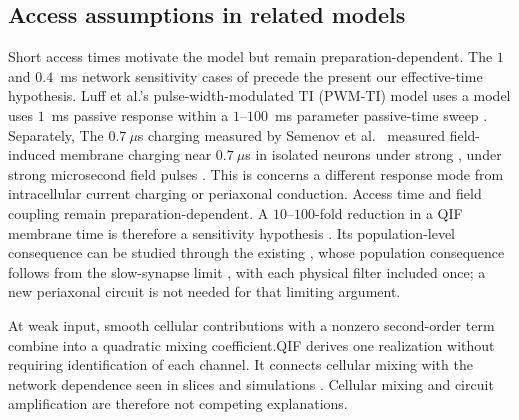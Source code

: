 \documentclass[11pt,a4paper]{article}
\providecommand{\DIFaddtex}[1]{{\protect\color{blue} \sf #1}} %
\providecommand{\DIFdeltex}[1]{{\protect\color{red} \scriptsize #1}} %
\providecommand{\DIFaddbegin}{} %
\providecommand{\DIFaddend}{} %
\providecommand{\DIFdelbegin}{} %
\providecommand{\DIFdelend}{} %
\providecommand{\DIFadd}[1]{\texorpdfstring{\DIFaddtex{#1}}{#1}} %
\providecommand{\DIFdel}[1]{\texorpdfstring{\DIFdeltex{#1}}{}} %
\begin{document}
\subsection{\DIFadd{Access assumptions in related models}}
\DIFadd{Short access times motivate the model but remain preparation-dependent}\DIFaddend .
The $1$ and $0.4$~ms \DIFdelbegin \DIFdel{network sensitivity }\DIFdelend cases of \cite{esmaeilpour2021} precede \DIFdelbegin \DIFdel{the present }\DIFdelend \DIFaddbegin \DIFadd{our }\DIFaddend effective-time
hypothesis. Luff et al.'s pulse-width-modulated TI \DIFdelbegin \DIFdel{(PWM-TI) model uses a }\DIFdelend \DIFaddbegin \DIFadd{model uses }\DIFaddend $1$~ms \DIFdelbegin \DIFdel{passive response }\DIFdelend within a
$1$--$100$~ms \DIFdelbegin \DIFdel{parameter }\DIFdelend \DIFaddbegin \DIFadd{passive-time }\DIFaddend sweep \cite{luff2024}. \DIFdelbegin \DIFdel{Separately, }\DIFdelend \DIFaddbegin \DIFadd{The $0.7~\mu$s charging
measured by }\DIFaddend Semenov et al.\ \DIFdelbegin \DIFdel{\cite{semenov2025} measured field-induced membrane charging near $0.7~\mu$s in
isolated neurons under strong , }\DIFdelend \DIFaddbegin \DIFadd{under strong }\DIFaddend microsecond field pulses
\DIFdelbegin \DIFdel{. This is }\DIFdelend \DIFaddbegin \DIFadd{\cite{semenov2025} concerns }\DIFaddend a different response mode from intracellular
current charging or periaxonal conduction. \DIFdelbegin \DIFdel{Access time and field coupling remain preparation-dependent. }\DIFdelend A $10$--$100$-fold reduction in
\DIFdelbegin \DIFdel{a }\DIFdelend QIF membrane time is therefore a sensitivity hypothesis\DIFdelbegin \DIFdel{. Its
population-level consequence can be studied through the existing }\DIFdelend \DIFaddbegin \DIFadd{, whose population
consequence follows from the }\DIFaddend slow-synapse limit\DIFdelbegin \DIFdel{, with each physical filter included once; a new periaxonal circuit is not
needed for that limiting argument}\DIFdelend .

\DIFdelbegin \DIFdel{At weak input, smooth cellular contributions with a nonzero second-order term
combine into a quadratic mixing coefficient.QIF derives one realization without
requiring identification of each channel. It connects cellular mixing
\cite{mirzakhalili2020,luff2024mixer} with the network dependence seen in slices
and simulations \cite{caldas2024,karimi2024}. Cellular mixing and circuit amplification are therefore not competing explanations.
}\DIFdelend \DIFaddbegin \fi
\DIFaddend
\end{document}
